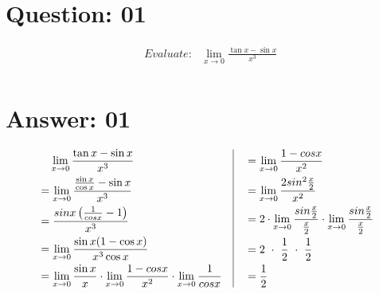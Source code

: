 \documentclass[17pt]{extarticle}
\begin{document}
\noindent

\begin{fleqn} 


\section{Question: 01}

\begin{equation} \nonumber
\begin{alignedat}{4}
& Evaluate :\ \ \ 
\lim_{x \to 0} \frac{\tan{x} - \sin{x}}{x^3}\\
\end{alignedat}
\end{equation}



\section{Answer: 01}

\begin{equation} \nonumber
\begin{alignedat}{4}
& \texttt{\ \ } \lim_{x \to 0} \frac{\tan{x} - \sin{x}}{x^3}\\
&= \lim_{x \to 0} \frac{\frac{\sin{x}}{\cos{x}}-\sin{x}}{x^3}\\
&= \frac{sin x\left(\frac{1}{cos x} - 1\right)}{x^3}\\
&= \lim_{x \to 0} \frac{\sin{x}(1  - \cos{x})}{x^3\cos{x}}\\
&= \lim_{x \to 0} \frac{\sin{x}}{x}\cdot\lim_{x \to 0} \frac{1 - cos x}{x^2}\cdot\lim_{x \to 0}\frac{1}{cos x}\\
\end{alignedat}
\quad
\vrule
\quad
\begin{alignedat}{4}
&= \lim_{x \to 0} \frac{1 - cos x}{x^2}\\
&= \lim_{x \to 0} \frac{2sin^2\frac{x}{2}}{x^2}\\
&= 2\cdot\lim_{x \to 0} \frac{sin\frac{x}{2}}{\frac{x}{2}}\cdot\lim_{x \to 0} \frac{sin\frac{x}{2}}{\frac{x}{2}}\\
&= 2\ \cdot\ \frac{1}{2}\ \cdot\ \frac{1}{2}\\
&= \frac{1}{2}
\end{alignedat}
\end{equation}



\end{fleqn}
\end{document}
